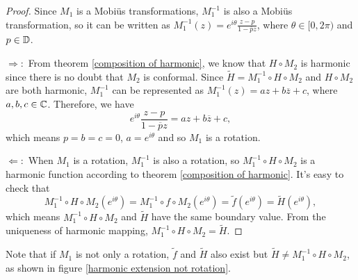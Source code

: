 \documentclass[review,onefignum,onetabnum]{siamonline190516}
\begin{document}
    \begin{proof}
        Since $M_1$ is a Mobi\"us transformations, $M_1^{-1}$ is also a Mobi\"us transformation, so it can be written as $M_1^{-1}(z) = e^{i \theta}\frac{z - p}{1 - \overline{p}z}$, where $\theta \in [0, 2\pi)$ and $p \in \mathbb{D}$.

        $\Rightarrow :$ From theorem \ref{composition of harmonic}, we know that $H \circ M_2$ is harmonic since there is no doubt that $M_2$ is conformal. Since $\tilde{H} = M_1^{-1} \circ H \circ M_2$ and $H \circ M_2$ are both harmonic, $M_1^{-1}$ can be represented as $M_1^{-1}(z) = az + b \overline{z} + c$, where $a, b, c \in \mathbb{C}$. Therefore, we have 
        \begin{equation*}
            e^{i \theta}\frac{z - p}{1 - \overline{p}z} = az + b \overline{z} + c,
        \end{equation*}
        which means $p = b = c = 0$, $a = e^{i \theta}$ and so $M_1$ is a rotation.

        $\Leftarrow :$ When $M_1$ is a rotation, $M_1^{-1}$ is also a rotation, so $M_1^{-1} \circ H \circ M_2$ is a harmonic function according to theorem \ref{composition of harmonic}. It's easy to check that
        \begin{equation*}
            M_1^{-1} \circ H \circ M_2 (e^{i \theta})
            = M_1^{-1} \circ f \circ M_2(e^{i \theta})
            = \tilde{f}(e^{i \theta}) = \tilde{H} (e^{i \theta}),
        \end{equation*}
        which means $M_1^{-1} \circ H \circ M_2$ and $\tilde{H}$ have the same boundary value. From the uniqueness of harmonic mapping, $M_1^{-1} \circ H \circ M_2 = \tilde{H}$.
    \end{proof}
            
    Note that if $M_1$ is not only a rotation, $\tilde{f}$ and $\tilde{H}$ also exist but $\tilde{H} \neq M_1^{-1} \circ H \circ M_2$, as shown in figure \ref{harmonic extension not rotation}.
\end{document}
